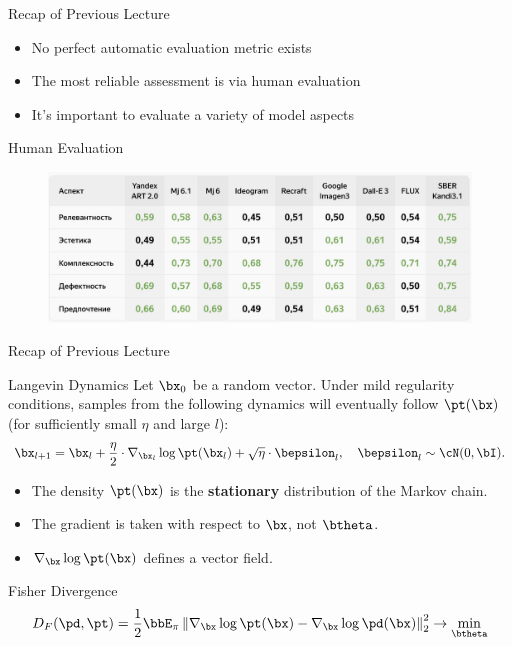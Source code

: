 \documentclass{beamer}
\begin{document}
\begin{frame}{Recap of Previous Lecture}
	\begin{itemize}
		\item No perfect automatic evaluation metric exists
		\item The most reliable assessment is via human evaluation
		\item It's important to evaluate a variety of model aspects
	\end{itemize}
	\begin{block}{Human Evaluation}
		\begin{figure}
			\includegraphics[width=1.0\linewidth]{figs/yaart_2.5}
		\end{figure}
	\end{block}
\end{frame}
\begin{frame}{Recap of Previous Lecture}
	\vspace{-0.3cm}
	\begin{block}{Langevin Dynamics}
		Let $\bx_0$ be a random vector. Under mild regularity conditions, samples from the following dynamics will eventually follow $\pt(\bx)$ (for sufficiently small $\eta$ and large $l$):
		\[
			\bx_{l + 1} = \bx_l + \frac{\eta}{2} \cdot \nabla_{\bx_l} \log \pt(\bx_l) + \sqrt{\eta} \cdot \bepsilon_l, \quad \bepsilon_l \sim \cN(0, \bI).
		\]
		\vspace{-0.5cm}
		\begin{itemize}
			\item The density $\pt(\bx)$ is the \textbf{stationary} distribution of the Markov chain.
			\item The gradient is taken with respect to $\bx$, not $\btheta$.
			\item $\nabla_{\bx} \log \pt(\bx)$ defines a vector field.
		\end{itemize}
	\end{block}
	\vspace{-0.3cm}
	\begin{block}{Fisher Divergence}
		\vspace{-0.7cm}
		\[
			D_F(\pd, \pt) = \frac{1}{2}\bbE_{\pi}\left\| \nabla_{\bx}\log \pt(\bx) - \nabla_\bx \log \pd(\bx) \right\|_2^2 \rightarrow \min_{\btheta}
		\]
		\vspace{-0.7cm}
	\end{block}
\end{frame}
\end{document}
